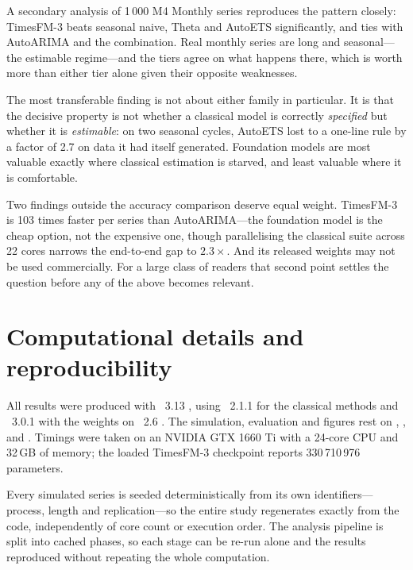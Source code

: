\documentclass[article]{ajs}
\begin{document}
A secondary analysis of 1\,000 M4 Monthly series reproduces the pattern closely: TimesFM-3 beats
seasonal naive, Theta and AutoETS significantly, and ties with AutoARIMA and the combination.
Real monthly series are long and seasonal---the estimable regime---and the tiers agree on what
happens there, which is worth more than either tier alone given their opposite weaknesses.

The most transferable finding is not about either family in particular. It is that the
decisive property is not whether a classical model is correctly \emph{specified} but whether it
is \emph{estimable}: on two seasonal cycles, AutoETS lost to a one-line rule by a factor of
2.7 on data it had itself generated. Foundation models are most valuable exactly where
classical estimation is starved, and least valuable where it is comfortable.

Two findings outside the accuracy comparison deserve equal weight. TimesFM-3 is 103 times
faster per series than AutoARIMA---the foundation model is the cheap option, not the expensive
one, though parallelising the classical suite across 22 cores narrows the end-to-end gap to
$2.3\times$. And its released weights may not be used commercially. For a large class of readers
that second point settles the question before any of the above becomes relevant.

\section{Computational details and reproducibility}
\label{sec:repro}

All results were produced with ~3.13 \citep{python}, using
~2.1.1 \citep{statsforecast} for the classical methods and
~3.0.1 with the  weights \citep{timesfm3repo}
on ~2.6 \citep{paszke2019pytorch}. The simulation, evaluation and figures rest on
 \citep{harris2020numpy},  \citep{mckinney2010pandas}, 
\citep{virtanen2020scipy} and  \citep{hunter2007matplotlib}. Timings were taken
on an NVIDIA GTX 1660 Ti with a 24-core CPU and 32\,GB of memory; the loaded TimesFM-3
checkpoint reports 330\,710\,976 parameters.

Every simulated series is seeded deterministically from its own identifiers---process, length
and replication---so the entire study regenerates exactly from the code, independently of core
count or execution order. The analysis pipeline is split into cached phases, so each stage can
be re-run alone and the results reproduced without repeating the whole computation.
\end{document}
